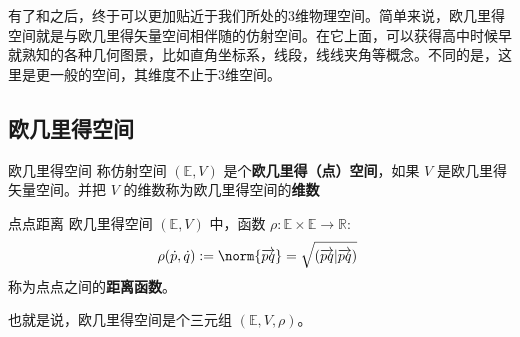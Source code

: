 
\begin{issues}
\issueDraft
\end{issues}

有了和之后，终于可以更加贴近于我们所处的3维物理空间。简单来说，欧几里得空间就是与欧几里得矢量空间相伴随的仿射空间。在它上面，可以获得高中时候早就熟知的各种几何图景，比如直角坐标系，线段，线线夹角等概念。不同的是，这里是更一般的空间，其维度不止于3维空间。
\subsection{欧几里得空间}
\begin{definition}{欧几里得空间}
称仿射空间 $(\mathbb E,V)$ 是个\textbf{欧几里得（点）空间}，如果 $V$ 是欧几里得矢量空间。并把 $V$ 的维数称为欧几里得空间的\textbf{维数}
\end{definition}
\begin{definition}{点点距离}
欧几里得空间 $(\mathbb E,V)$ 中，函数 $\rho:\mathbb E\times\mathbb E\rightarrow\mathbb R$:
\begin{equation}
\rho(\dot p,\dot q):=\norm{\overrightarrow{pq}}=\sqrt{(\overrightarrow{pq}|\overrightarrow{pq})}~
\end{equation}
称为点点之间的\textbf{距离函数}。
\end{definition}
也就是说，欧几里得空间是个三元组 $(\mathbb E,V,\rho)$。

